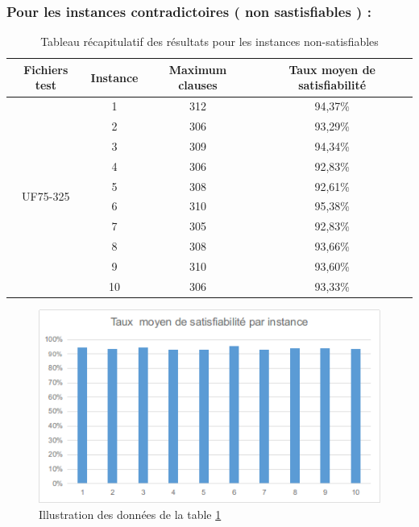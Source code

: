\subsubsection{Pour les instances contradictoires ( non sastisfiables ) :  }
\begin{table}[H]
	\centering
	\begin{tabular}{|c|c|c|c|}
		\hline
		Fichiers test              & Instance & Maximum clauses & Taux moyen de satisfiabilité \\ \hline
		\multirow{10}{*}{UF75-325} & 1        & 312             & 94,37\%                      \\ \cline{2-4} 
		& 2        & 306             & 93,29\%                      \\ \cline{2-4} 
		& 3        & 309             & 94,34\%                      \\ \cline{2-4} 
		& 4        & 306             & 92,83\%                      \\ \cline{2-4} 
		& 5        & 308             & 92,61\%                      \\ \cline{2-4} 
		& 6        & 310             & 95,38\%                      \\ \cline{2-4} 
		& 7        & 305             & 92,83\%                      \\ \cline{2-4} 
		& 8        & 308             & 93,66\%                      \\ \cline{2-4} 
		& 9        & 310             & 93,60\%                      \\ \cline{2-4} 
		& 10       & 306             & 93,33\%                      \\ \hline
	\end{tabular}
	\caption{Tableau récapitulatif des résultats pour les instances non-satisfiables}
	\label{table:Tab_DFS_Non_Sat}
\end{table}
\begin{figure}[H]
	\includegraphics[width=\textwidth]{images/DFSUUF75Graph.png}
	\caption{Illustration des données de la table \ref{table:Tab_DFS_Non_Sat}}
\end{figure}
\newpage
